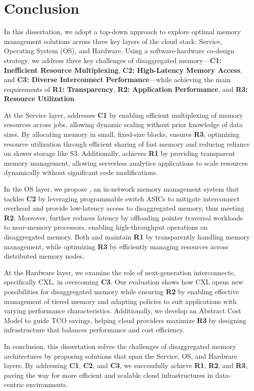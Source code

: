 \chapter{Conclusion}
\label{chap:conclusion}

In this dissertation, we adopt a top-down approach to explore optimal memory management solutions across three key layers of the cloud stack: Service, Operating System (OS), and Hardware. Using a software-hardware co-design strategy, we address three key challenges of disaggregated memory—\textbf{C1: Inefficient Resource Multiplexing}, \textbf{C2: High-Latency Memory Access}, and \textbf{C3: Diverse Interconnect Performance}—while achieving the main requirements of \textbf{R1: Transparency}, \textbf{R2: Application Performance}, and \textbf{R3: Resource Utilization}.

At the Service layer, \jiffy addresses \textbf{C1} by enabling efficient multiplexing of memory resources across jobs, allowing dynamic scaling without prior knowledge of data sizes. By allocating memory in small, fixed-size blocks, \jiffy ensures \textbf{R3}, optimizing resource utilization through efficient sharing of fast memory and reducing reliance on slower storage like S3. Additionally, \jiffy achieves \textbf{R1} by providing transparent memory management, allowing serverless analytics applications to scale resources dynamically without significant code modifications.

In the OS layer, we propose \mind, an in-network memory management system that tackles \textbf{C2} by leveraging programmable switch ASICs to mitigate interconnect overhead and provide low-latency access to disaggregated memory, thus meeting \textbf{R2}. Moreover, \pulse further reduces latency by offloading pointer traversal workloads to near-memory processors, enabling high-throughput operations on disaggregated memory. Both \mind and \pulse maintain \textbf{R1} by transparently handling memory management, while optimizing \textbf{R3} by efficiently managing resources across distributed memory nodes.

At the Hardware layer, we examine the role of next-generation interconnects, specifically CXL, in overcoming \textbf{C3}. Our evaluation shows how CXL opens new possibilities for disaggregated memory while ensuring \textbf{R2} by enabling effective management of tiered memory and adapting policies to suit applications with varying performance characteristics. Additionally, we develop an Abstract Cost Model to guide TCO savings, helping cloud providers maximize \textbf{R3} by designing infrastructure that balances performance and cost efficiency.

In conclusion, this dissertation solves the challenges of disaggregated memory architectures by proposing solutions that span the Service, OS, and Hardware layers. By addressing \textbf{C1}, \textbf{C2}, and \textbf{C3}, we successfully achieve \textbf{R1}, \textbf{R2}, and \textbf{R3}, paving the way for more efficient and scalable cloud infrastructures in data-centric environments.
